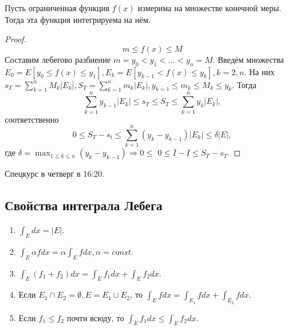 \documentclass[11pt]{article}
\newcounter{th}\setcounter{th}{0}
\def\th{\par\smallskip\refstepcounter{th}\textbf{\arabic{th}}}
\newtheorem*{Theorem}{Теорема \th}
\begin{document}
\begin{Theorem}
Пусть ограниченная функция $f(x)$ измерима на множестве конечной меры. Тогда эта функция
интегрируема на нём.
\end{Theorem}
\begin{proof}
\begin{equation}
m \leq f(x) \leq M
\end{equation}
Составим лебегово разбиение $m = y_0 < y_1 < \ldots < y_n = M$. Введём множества
$E_0 = E[y_0 \leq f(x) \leq y_1], E_k = E[y_{k - 1} < f(x) \leq y_k], k = \overline{2, n}$.
На них $s_T = \sum_{k = 1}^nM_k|E_k|, S_T = \sum_{k = 1}^nm_k|E_k|, y_{k = 1} \leq m_k \leq M_k \leq y_k$.
Тогда
\begin{equation}
\sum_{k = 1}^ny_{k - 1}|E_k| \leq s_T \leq S_T \leq \sum_{k = 1}^ny_k|E_k|,
\end{equation}
соответственно
\begin{equation}
0 \leq S_T - s_t \leq \sum_{k = 1}^n(y_k - y_{k - 1})|E_k| \leq \delta|E|,
\end{equation}
где $\delta = \max_{1 \leq k \leq n}(y_k - y_{k - 1}) \Rightarrow 0 \leq$
$0 \leq \overline{I} - \underline{I} \leq S_T - s_T$.
\end{proof}
Спецкурс в четверг в 16:20.
\subsection{Свойства интеграла Лебега}
\label{sec:orgeed9315}
\begin{enumerate}
\item \(\int_Edx = |E|\).
\item \(\int_E\alpha fdx = \alpha\int_Efdx, \alpha = const\).
\item \(\int_E(f_1 + f_2)dx = \int_Ef_1dx + \int_Ef_2dx\).
\item Если \(E_1 \cap E_2 = \emptyset, E = E_1 \cup E_2\), то \(\int_Efdx = \int_{E_1}fdx + \int_{E_2}fdx\).
\item Если \(f_1 \leq f_2\) почти всюду, то \(\int_Ef_1dx \leq \int_Ef_2dx\).
\end{enumerate}
\end{document}
